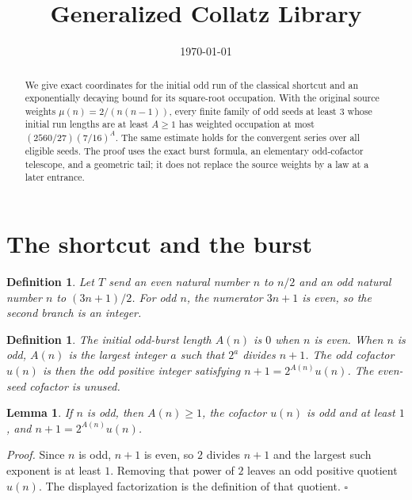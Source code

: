 \documentclass[11pt,letterpaper]{article}
\title{Generalized Collatz Library}
\author{}
\date{\today}
\newtheorem{lemma}[theorem]{Lemma}
\newtheorem{definition}[theorem]{Definition}
\newenvironment{proof}{\noindent\textit{Proof.}}{\hfill\(\square\)}
\begin{document}
\maketitle

\begin{abstract}
We give exact coordinates for the initial odd run of the classical shortcut and an exponentially decaying bound for its square-root occupation. With the original source weights \(\mu(n)=2/(n(n-1))\), every finite family of odd seeds at least \(3\) whose initial run lengths are at least \(A\ge1\) has weighted occupation at most \((2560/27)(7/16)^A\). The same estimate holds for the convergent series over all eligible seeds. The proof uses the exact burst formula, an elementary odd-cofactor telescope, and a geometric tail; it does not replace the source weights by a law at a later entrance.
\end{abstract}

\section{The shortcut and the burst}

\begin{definition}
Let \(T\) send an even natural number \(n\) to \(n/2\) and an odd natural number \(n\) to \((3n+1)/2\). For odd \(n\), the numerator \(3n+1\) is even, so the second branch is an integer.
\end{definition}

\begin{definition}
The initial odd-burst length \(A(n)\) is \(0\) when \(n\) is even. When \(n\) is odd, \(A(n)\) is the largest integer \(a\) such that \(2^{a}\) divides \(n+1\). The odd cofactor \(u(n)\) is then the odd positive integer satisfying \(n+1=2^{A(n)}u(n)\). The even-seed cofactor is unused.
\end{definition}

\begin{lemma}
\label{lem:split}
If \(n\) is odd, then \(A(n)\ge 1\), the cofactor \(u(n)\) is odd and at least \(1\), and \(n+1=2^{A(n)}u(n)\).
\end{lemma}

\begin{proof}
Since \(n\) is odd, \(n+1\) is even, so \(2\) divides \(n+1\) and the largest such exponent is at least \(1\). Removing that power of \(2\) leaves an odd positive quotient \(u(n)\). The displayed factorization is the definition of that quotient.
\end{proof}
\end{document}
